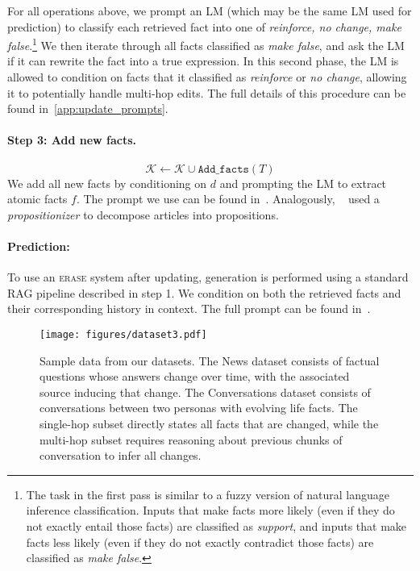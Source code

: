\documentclass[11pt]{article}
\newcommand{\ourmethod}{\textsc{erase}\xspace}
\newcommand{\doc}{d}
\newcommand{\kb}{\mathcal{K}}
\newcommand{\fact}{f}
\begin{document}
For all operations above, we prompt an LM (which may be the same LM used for prediction) to classify each retrieved fact into one of \textit{reinforce, no change, make false}.\footnote{The task in the first pass is similar to a fuzzy version of natural language inference classification. Inputs that make facts more likely (even if they do not exactly entail those facts) are classified as \textit{support}, and inputs that make facts less likely (even if they do not exactly contradict those facts) are classified as \textit{make false}.}
We then iterate through all facts classified as \textit{make false}, and ask the LM if it can rewrite the fact into a true expression. In this second phase, the LM is allowed to condition on facts that it classified as \textit{reinforce} or \textit{no change}, allowing it to potentially handle multi-hop edits. The full details of this procedure can be found in~\cref{app:update_prompts}.






\paragraph{Step 3: Add new facts.} 

\begin{equation}
    \kb \leftarrow \kb \cup \texttt{Add\_facts}(T)
\end{equation}
We add all new facts by conditioning on $\doc$ and prompting the LM to extract atomic facts $\fact$. The prompt we use can be found in~.
Analogously, ~\citet{chen2023dense} used a \textit{propositionizer} to decompose articles into propositions. 


\paragraph{Prediction:}
To use an \ourmethod system after updating, generation is performed using a standard RAG pipeline described in step 1.
We condition on both the retrieved facts and their corresponding history in context. The full prompt can be found in~.


\begin{figure*}
    \centering
    \texttt{[image: figures/dataset3.pdf]}
    \caption{Sample data from our datasets. The News dataset consists of factual questions whose answers change over time, with the associated source inducing that change. The Conversations dataset consists of conversations between two personas with evolving life facts. The single-hop subset directly states all facts that are changed, while the multi-hop subset requires reasoning about previous chunks of conversation to infer all changes.}
    \label{fig:dataset}
\end{figure*}
\end{document}
